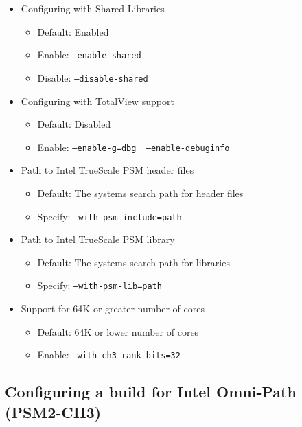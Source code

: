 \begin{itemize}
	\item Configuring with Shared Libraries
		\begin{itemize}
			\item Default: Enabled
			\item Enable: \texttt{--enable-shared}
            \item Disable: \texttt{--disable-shared}
		\end{itemize}

	\item Configuring with TotalView support
		\begin{itemize}
			\item Default: Disabled
			\item Enable: \texttt{--enable-g=dbg \
                                   --enable-debuginfo}
		\end{itemize}

    \item{Path to Intel TrueScale PSM header files}
    \begin{itemize}
        \item{Default: The systems search path for header files}
        \item{Specify: \texttt{--with-psm-include=path}}
    \end{itemize}
    
    \item{Path to Intel TrueScale PSM library}
    \begin{itemize}
        \item{Default: The systems search path for libraries}
        \item{Specify: \texttt{--with-psm-lib=path}}
        \end{itemize}

	\item Support for 64K or greater number of cores
		\begin{itemize}
			\item Default: 64K or lower number of cores
			\item Enable: \texttt{--with-ch3-rank-bits=32}
		\end{itemize}
       \end{itemize}

\subsection{Configuring a build for Intel Omni-Path (PSM2-CH3)}
\label{subsec:config-psm2}

